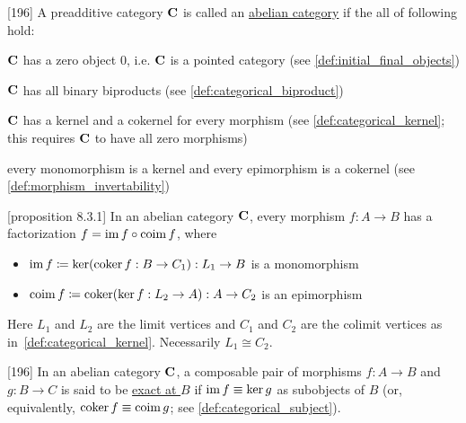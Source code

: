 \begin{definition}\label{def:abelian_category}\cite{MacLane1994}[196]
  A preadditive category $\operatorname{\mathbf{C}}$ is called an \uline{abelian category} if the all of following hold:
  \begin{defenum}
    \item $\operatorname{\mathbf{C}}$ has a zero object $0$, i.e. $\operatorname{\mathbf{C}}$ is a pointed category (see \cref{def:initial_final_objects})
    \item $\operatorname{\mathbf{C}}$ has all binary biproducts (see \cref{def:categorical_biproduct})
    \item $\operatorname{\mathbf{C}}$ has a kernel and a cokernel for every morphism (see \cref{def:categorical_kernel}; this requires $\operatorname{\mathbf{C}}$ to have all zero morphisms)
    \item every monomorphism is a kernel and every epimorphism is a cokernel (see \cref{def:morphism_invertability})
  \end{defenum}
\end{definition}

\begin{proposition}\label{def:abelian_category_morphism_factorization}\cite{MacLane1994}[proposition 8.3.1]
  In an abelian category $\operatorname{\mathbf{C}}$, every morphism $f: A \to B$ has a factorization $f = \operatorname{im} f \circ \operatorname{coim} f$, where
  \begin{itemize}
    \item $\operatorname{im} f \coloneqq \operatorname{ker}(\operatorname{coker} f: B \to C_1): L_1 \to B$ is a monomorphism
    \item $\operatorname{coim} f \coloneqq \operatorname{coker}(\operatorname{ker} f: L_2 \to A): A \to C_2$ is an epimorphism
  \end{itemize}
  Here $L_1$ and $L_2$ are the limit vertices and $C_1$ and $C_2$ are the colimit vertices as in~\cref{def:categorical_kernel}. Necessarily $L_1 \cong C_2$.
\end{proposition}

\begin{definition}\label{def:exact_morphism_pair}\cite{MacLane1994}[196]
  In an abelian category $\operatorname{\mathbf{C}}$, a composable pair of morphisms $f: A \to B$ and $g: B \to C$ is said to be \uline{exact at $B$} if $\operatorname{im} f \equiv \operatorname{ker} g$ as subobjects of $B$ (or, equivalently, $\operatorname{coker} f \equiv \operatorname{coim} g$; see \cref{def:categorical_subject}).
\end{definition}

